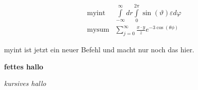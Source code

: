 \documentclass[12pt, a4paper, twopage]{scrartcl}
\begin{document}
\begin{appendix}
\newcommand{\myint}{\int\limits_{-\infty}^{\infty} dr \int\limits_{0}^{2 \pi} \sin(\vartheta) \varepsilon d\varphi}

\newcommand{\mysum}[3]{\sum\limits_{j = 0}^{\infty} \frac{#1\cdot #2}{#3} e^{- 3 \cos(\theta \phi)}}

\begin{align*}
  &\text{myint} & \myint\\
  &\text{mysum} & \mysum{x}{y}{z}
\end{align*}

\renewcommand{\myint}{myint ist jetzt ein neuer Befehl und macht nur noch das hier.}

\myint

\vspace{2cm}
\newcommand{\fett}[1]{{\bf #1}}

\fett{fettes hallo}

\newcommand{\kursiv}[1]{{\it #1}}

\kursiv{kursives hallo}



\end{appendix}







\printbibliography
\end{document}
